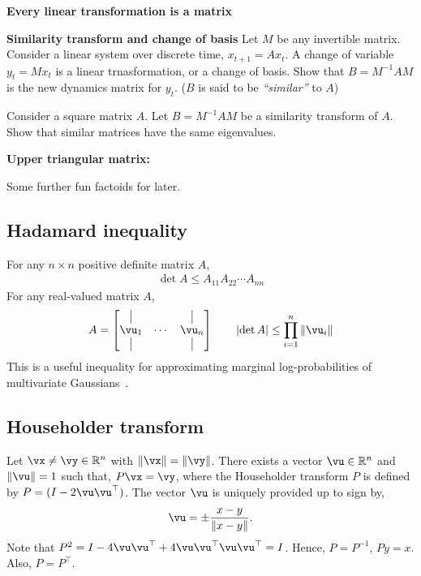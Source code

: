 \documentclass[a4paper,11pt]{exam}
\newcounter{ct}
\newcommand{\inv}{^{-1}}
\newcommand{\tp}[1]{\ensuremath{{#1}^\top}} %
\newcommand{\norm}[1]{\ensuremath{\Vert{#1}\Vert}}
\providecommand{\abs}[1]{\lvert#1\rvert}
\newcommand{\field}[1]{\ensuremath{\mathbb{#1}}}
\newcommand{\reals}{\field{R}}
\begin{document}
\begin{questions}
\question \textbf{Every linear transformation is a matrix}

\question \textbf{Similarity transform and change of basis}
Let $M$ be any invertible matrix.
Consider a linear system over discrete time, $x_{t+1} = Ax_t$.
A change of variable $y_t = Mx_t$ is a linear trnasformation, or a change of basis.
Show that $B = M\inv A M$ is the new dynamics matrix for $y_t$.
($B$ is said to be \textit{``similar''} to $A$)

\question Consider a square matrix $A$. Let $B = M\inv A M$ be a similarity transform of $A$.
Show that similar matrices have the same eigenvalues.

\question \textbf{Upper triangular matrix:}


Some further fun factoids for later.
\subsection{Hadamard inequality}
For any $n \times n$ positive definite matrix $A$,
\begin{align}
    \det{A} \leq A_{11} A_{22} \cdots A_{nn}
\end{align}
For any real-valued matrix $A$,
\begin{align}
    A = 
    \begin{bmatrix}
	\kern.3em\vline\kern.3em
	&
	&
	\kern.3em\vline\kern.3em
	\\
	\vu_1 & \cdots & \vu_n \\
	\kern.3em\vline\kern.3em
	&
	&
	\kern.3em\vline\kern.3em
    \end{bmatrix}
    \qquad
    \abs{\det{A}} \leq \prod_{i=1}^n \norm{\vu_i}
\end{align}
This is a useful inequality for approximating marginal log-probabilities of multivariate Gaussians~\citep{Zhang2013a}.
\subsection{Householder transform}
Let $\vx \neq \vy \in \reals^n$ with $\norm{\vx} = \norm{\vy}$.
There exists a vector $\vu \in \reals^n$ and $\norm{\vu} = 1$ such that, $P\vx = \vy$,
where the Householder transform $P$ is defined by $P = (I - 2\vu\tp{\vu})$.
The vector $\vu$ is uniquely provided up to sign by,
\[
    \vu = \pm \frac{x-y}{\norm{x-y}}.
\]
Note that $P^2 = I - 4\vu\tp{\vu} + 4\vu\tp{\vu}\vu\tp{\vu} = I$.
Hence, $P = P\inv$, $Py = x$. Also, $P = \tp{P}$.


\end{questions}
\end{document}
